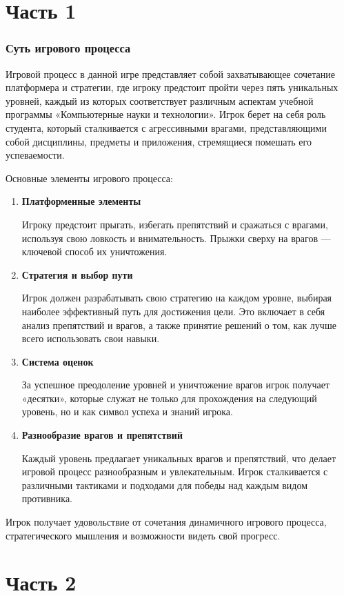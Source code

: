 \documentclass{article}
\begin{document}
\section{Часть 1}

\subsubsection{Суть игрового процесса}
Игровой процесс в данной игре представляет собой захватывающее сочетание платформера и стратегии, где игроку предстоит пройти через пять уникальных уровней, каждый из которых соответствует различным аспектам учебной программы «Компьютерные науки и технологии». Игрок берет на себя роль студента, который сталкивается с агрессивными врагами, представляющими собой дисциплины, предметы и приложения, стремящиеся помешать его успеваемости.\par
Основные элементы игрового процесса:\par
\begin{enumerate}
    \item \textbf{Платформенные элементы} \par
    Игроку предстоит прыгать, избегать препятствий и сражаться с врагами, используя свою ловкость и внимательность. Прыжки сверху на врагов — ключевой способ их уничтожения.
    \item \textbf{Стратегия и выбор пути} \par
    Игрок должен разрабатывать свою стратегию на каждом уровне, выбирая наиболее эффективный путь для достижения цели. Это включает в себя анализ препятствий и врагов, а также принятие решений о том, как лучше всего использовать свои навыки.
    \item \textbf{Система оценок} \par
    За успешное преодоление уровней и уничтожение врагов игрок получает «десятки», которые служат не только для прохождения на следующий уровень, но и как символ успеха и знаний игрока.
    \item \textbf{Разнообразие врагов и препятствий} \par
    Каждый уровень предлагает уникальных врагов и препятствий, что делает игровой процесс разнообразным и увлекательным. Игрок сталкивается с различными тактиками и подходами для победы над каждым видом противника.
\end{enumerate}
Игрок получает удовольствие от сочетания динамичного игрового процесса, стратегического мышления и возможности видеть свой прогресс.

\section{Часть 2}
\end{document}

